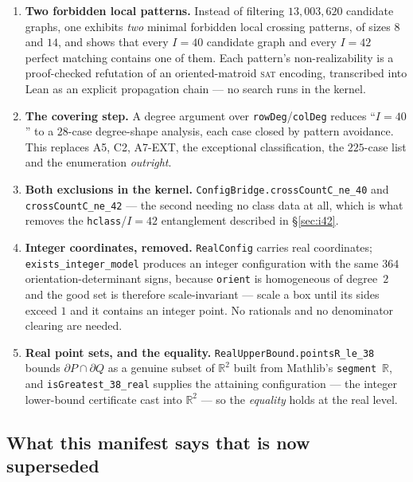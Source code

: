 \documentclass[11pt,a4paper]{article}
\theoremstyle{plain}
\theoremstyle{definition}
\theoremstyle{remark}
\begin{document}
\begin{enumerate}[leftmargin=*]
  \item \textbf{Two forbidden local patterns.} Instead of filtering
    $13{,}003{,}620$ candidate graphs, one exhibits \emph{two} minimal forbidden
    local crossing patterns, of sizes $8$ and $14$, and shows that every
    $I=40$ candidate graph and every $I=42$ perfect matching contains one of
    them. Each pattern's non-realizability is a proof-checked refutation of an
    oriented-matroid \textsc{sat} encoding, transcribed into Lean as an explicit
    propagation chain --- no search runs in the kernel.
  \item \textbf{The covering step.} A degree argument over
    \texttt{rowDeg}/\texttt{colDeg} reduces ``$I=40$'' to a $28$-case
    degree-shape analysis, each case closed by pattern avoidance. This replaces
    \textsf{A5}, \textsf{C2}, \textsf{A7-EXT}, the exceptional classification,
    the $225$-case list and the enumeration \emph{outright}.
  \item \textbf{Both exclusions in the kernel.}
    \texttt{ConfigBridge.crossCountC\_ne\_40} and
    \texttt{crossCountC\_ne\_42} --- the second needing no class data at all,
    which is what removes the \texttt{hclass}/$I=42$ entanglement described in
    \S\ref{sec:i42}.
  \item \textbf{Integer coordinates, removed.} \texttt{RealConfig} carries real
    coordinates; \texttt{exists\_integer\_model} produces an integer
    configuration with the same $364$ orientation-determinant signs, because
    \texttt{orient} is homogeneous of degree~$2$ and the good set is therefore
    scale-invariant --- scale a box until its sides exceed $1$ and it contains an
    integer point. No rationals and no denominator clearing are needed.
  \item \textbf{Real point sets, and the equality.}
    \texttt{RealUpperBound.pointsR\_le\_38} bounds
    $\partial P\cap\partial Q$ as a genuine subset of $\mathbb{R}^2$ built from
    Mathlib's \texttt{segment}~$\mathbb{R}$, and
    \texttt{isGreatest\_38\_real} supplies the attaining configuration --- the
    integer lower-bound certificate cast into $\mathbb{R}^2$ --- so the
    \emph{equality} holds at the real level.
\end{enumerate}

\subsection*{What this manifest says that is now superseded}
\end{document}
